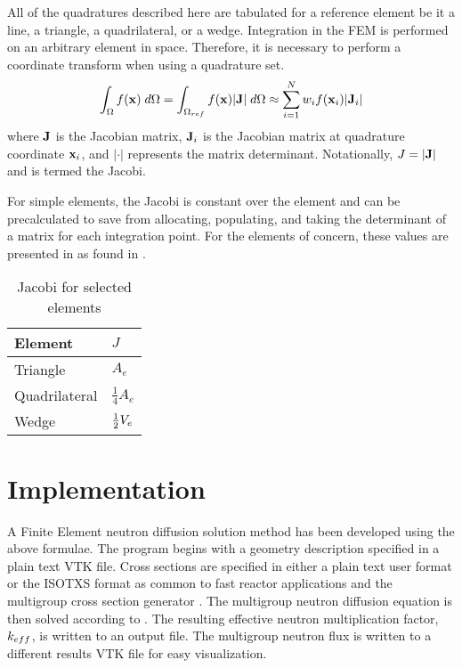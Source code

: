     All of the quadratures described here are tabulated for a reference element
    be it a line, a triangle, a quadrilateral, or a wedge. Integration in the 
    FEM is performed on an arbitrary element in space. Therefore, it is 
    necessary to perform a coordinate transform when using a quadrature set.
    \begin{equation}
      \int_{\Omega} f(\mathbf{x}) \;d\Omega = 
        \int_{\Omega_{ref}} f(\mathbf{x}) \lvert \mathbf{J} \rvert \;d\Omega \approx
        \sum_{i=1}^{N} w_i f(\mathbf{x}_i) \lvert \mathbf{J}_i \rvert
    \end{equation}
    where $\mathbf{J}$ is the Jacobian matrix, $\mathbf{J}_i$ is the Jacobian matrix at 
    quadrature coordinate $\mathbf{x}_i$, and $\lvert \cdot \rvert$ represents
    the matrix determinant. Notationally, $J=\lvert \mathbf{J} \rvert$ and is termed
    the Jacobi.
    
    For simple elements, the Jacobi is constant over the element and can be
    precalculated to save from allocating, populating, and taking the 
    determinant of a matrix for each integration point. For the elements of 
    concern, these values are presented in  as found in 
    \cite{textbookcolorado}.
    \begin{table}
      \caption{Jacobi for selected elements}
      \label{tab:jacobi}
      \begin{center}
        \begin{tabular}{ll}
          \toprule
          Element & $J$ \\
          \midrule
          Triangle      & $A_e$ \\
          Quadrilateral & $\frac{1}{4} A_e$ \\
          Wedge         & $\frac{1}{2} V_e$ \\
          \bottomrule
        \end{tabular}
      \end{center}
    \end{table}

\section{Implementation}
  A Finite Element neutron diffusion solution method has been developed using 
  the above formulae. The program begins with a geometry description specified
  in a plain text VTK file. Cross sections are specified in either a plain text
  user format or the ISOTXS format as common to fast reactor applications 
  and the multigroup cross section generator \mcc. The multigroup neutron 
  diffusion equation is then solved according to .
  The resulting effective neutron multiplication factor, $k_{eff}$, is written to
  an output file. The multigroup neutron flux is written to a different results
  VTK file for easy visualization.
